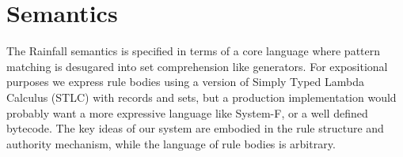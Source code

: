 
\section{Semantics}
The Rainfall semantics is specified in terms of a core language where pattern matching is desugared into set comprehension like generators. For expositional purposes we express rule bodies using a version of Simply Typed Lambda Calculus (STLC) with records and sets, but a production implementation would probably want a more expressive language like System-F, or a well defined bytecode. The key ideas of our system are embodied in the rule structure and authority mechanism, while the language of rule bodies is arbitrary.



